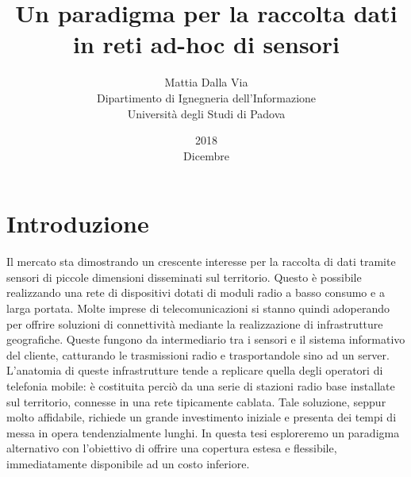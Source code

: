 \documentclass[a4paper,12pt]{article}
\title{Un paradigma per la raccolta dati in reti ad-hoc di sensori}
\date{2018\\ Dicembre}
\author{Mattia Dalla Via\\ Dipartimento di Ignegneria dell'Informazione\\ Università degli Studi di Padova}
\theoremstyle{definition}
\begin{document}
\maketitle

\clearpage

\tableofcontents


\section{Introduzione}




Il mercato sta dimostrando un crescente interesse per la raccolta di dati tramite sensori di piccole dimensioni disseminati sul territorio. Questo è possibile realizzando una rete di dispositivi dotati di moduli radio a basso consumo e a larga portata. Molte imprese di telecomunicazioni si stanno quindi adoperando per offrire soluzioni di connettività mediante la realizzazione di infrastrutture geografiche. Queste fungono da intermediario tra i sensori e il sistema informativo del cliente, catturando le trasmissioni radio e trasportandole sino ad un server. L'anatomia di queste infrastrutture tende a replicare quella degli operatori di telefonia mobile: è costituita perciò da una serie di stazioni radio base installate sul territorio, connesse in una rete tipicamente cablata. Tale soluzione, seppur molto affidabile, richiede un grande investimento iniziale e presenta dei tempi di messa in opera tendenzialmente lunghi. In questa tesi esploreremo un paradigma alternativo con l'obiettivo di offrire una copertura estesa e flessibile, immediatamente disponibile ad un costo inferiore.

\end{document}
